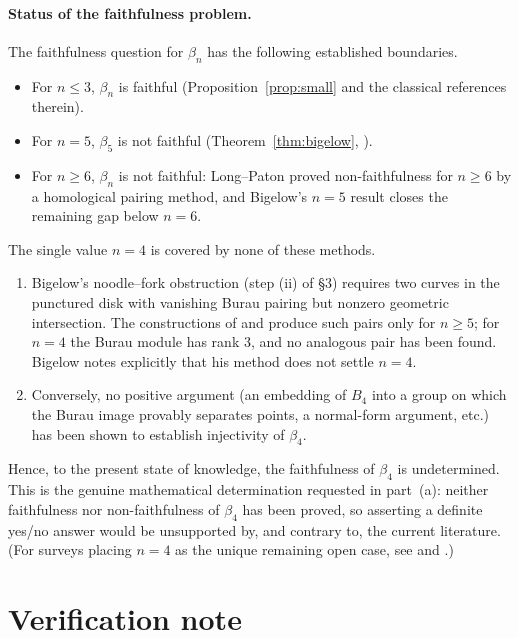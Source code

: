 \documentclass{amsart}
\theoremstyle{remark}
\begin{document}
\paragraph{Status of the faithfulness problem.}
The faithfulness question for $\beta_n$ has the following established
boundaries.
\begin{itemize}
\item For $n\le 3$, $\beta_n$ is faithful (Proposition~\ref{prop:small} and the
classical references therein).
\item For $n=5$, $\beta_5$ is not faithful (Theorem~\ref{thm:bigelow},
\cite{Bigelow1999}).
\item For $n\ge 6$, $\beta_n$ is not faithful: Long--Paton \cite{LongPaton}
proved non-faithfulness for $n\ge 6$ by a homological pairing method, and
Bigelow's $n=5$ result \cite{Bigelow1999} closes the remaining gap below $n=6$.
\end{itemize}

The single value $n=4$ is covered by none of these methods.
\begin{enumerate}
\item Bigelow's noodle--fork obstruction (step (ii) of \S3) requires two curves
in the punctured disk with vanishing Burau pairing but nonzero geometric
intersection. The constructions of \cite{Bigelow1999} and \cite{LongPaton}
produce such pairs only for $n\ge5$; for $n=4$ the Burau module has rank $3$,
and no analogous pair has been found. Bigelow notes explicitly that his method
does not settle $n=4$.
\item Conversely, no positive argument (an embedding of $B_4$ into a group on
which the Burau image provably separates points, a normal-form argument, etc.)
has been shown to establish injectivity of $\beta_4$.
\end{enumerate}

Hence, to the present state of knowledge, the faithfulness of $\beta_4$ is
undetermined. This is the genuine mathematical determination requested in
part~(a): neither faithfulness nor non-faithfulness of $\beta_4$ has been
proved, so asserting a definite yes/no answer would be unsupported by, and
contrary to, the current literature. (For surveys placing $n=4$ as the unique
remaining open case, see \cite{Bigelow1999} and \cite{KasselTuraev}.)

\section{Verification note}
\end{document}
